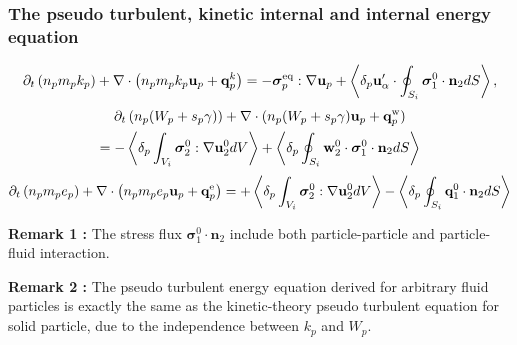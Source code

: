 \documentclass{sintefbeamer}
\begin{document}
\begin{frame}
  \frametitle{The pseudo turbulent, kinetic internal and internal  energy equation}
  \begin{equation*}
    \partial_t \left(n_p m_p k_p\right)
    + \mathbf{\nabla}\cdot \left(n_p
    m_p k_p \textbf{u}_p 
    + \textbf{q}^k_p
    \right)
    = 
    - \bm{\sigma}_p^\text{eq}  :\mathbf{\nabla} \textbf{u}_p
    + \left<\delta_p \textbf{u}_\alpha'\cdot\oint_{S_{i}} \bm{\sigma}_1^0 \cdot \textbf{n}_2 dS\right>,
  \end{equation*}
  \begin{multline*}
    \partial_t \left(n_p (W_p +s_p\gamma)\right)
    + \mathbf{\nabla}\cdot 
    (n_p (W_p+ s_p\gamma)
    \textbf{u}_p 
    +  \textbf{q}_p^\text{w}
    )\\
    = 
    - \left<\delta_p \int_{V_{i}} {\bm{\sigma}_2^0 : \mathbf{\nabla}\textbf{u}_2^0} dV\right>
    + \left<\delta_p \oint_{S_{i}} {\textbf{w}_2^0 \cdot \bm{\sigma}_1^0 \cdot  \textbf{n}_2} dS\right>
  \end{multline*}
  \begin{multline*}
    \partial_t \left(n_p m_p e_p\right)
    + \mathbf{\nabla}\cdot \left(n_p
    m_p e_p \textbf{u}_p 
    +  \textbf{q}_p^\text{e}
    \right)
    = 
    + \left<\delta_p \int_{V_{i}} {\bm{\sigma}_2^0 : \mathbf{\nabla}\textbf{u}_2^0} dV\right>
    - \left<\delta_p \oint_{S_{i}} {\textbf{q}_1^0\cdot \textbf{n}_2} dS\right>
  \end{multline*}
  

\textbf{Remark 1 :}
The stress flux $\bm{\sigma}_1^0 \cdot \textbf{n}_2$ include both particle-particle and particle-fluid interaction. 


\textbf{Remark 2 : }
The pseudo turbulent energy equation derived for arbitrary fluid particles is exactly the same as the kinetic-theory pseudo turbulent equation for solid particle, due to the independence between $k_p$ and $W_p$. 
\end{frame}
\end{document}

